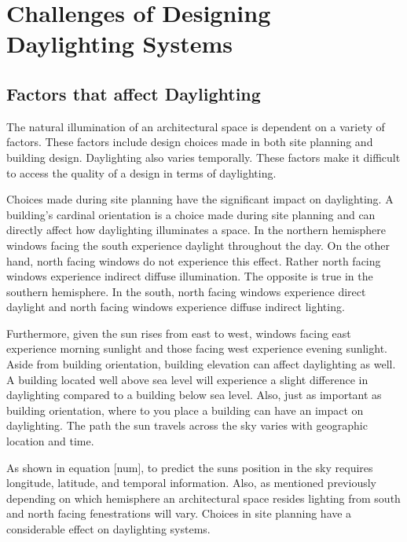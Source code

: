\section{Challenges of Designing Daylighting Systems}


\subsection{Factors that affect Daylighting}
The natural illumination of an architectural space is dependent on a variety of factors. These factors include design choices made in both site planning and building design. Daylighting also varies temporally.
These factors make it difficult to access the quality of a design in terms of daylighting.

Choices made during site planning have the significant impact on daylighting.
A building's cardinal orientation is a choice made during site planning and can directly affect how daylighting illuminates a space.
In the northern hemisphere windows facing the south experience daylight throughout the day.
On the other hand, north facing windows do not experience this effect.
Rather north facing windows experience indirect diffuse illumination.
The opposite is true in the southern hemisphere.
In the south, north facing windows experience direct daylight and north facing windows experience diffuse indirect lighting.

Furthermore, given the sun rises from east to west, windows facing east experience morning sunlight and those facing west experience evening sunlight.
Aside from building orientation, building elevation can affect daylighting as well.
A building located well above sea level will experience a slight difference in daylighting compared to a building below sea level.
Also, just as important as building orientation, where to you place a building can have an impact on daylighting.
The path the sun travels across the sky varies with geographic location and time.

As shown in equation [num], to predict the suns position in the sky requires longitude, latitude, and temporal information. Also, as mentioned previously depending on which hemisphere an architectural space resides lighting from south and north facing fenestrations will vary.
Choices in site planning have a considerable effect on daylighting systems.

